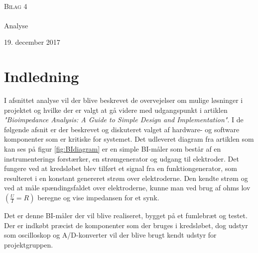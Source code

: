 
\usepackage{siunitx}


\begin{titlingpage}
\begin{center}

~ \\[3cm]


\textsc{\LARGE Bilag 4}\\[1.5cm]


\noindent\makebox[\linewidth]{\rule{\textwidth}{0.4pt}}\\
[0.5cm]{\Huge Analyse}
\noindent\makebox[\linewidth]{\rule{\textwidth}{0.4pt}}
\end{center}
\vfill
\begin{center}
{\large 19. december 2017}
\end{center}
\end{titlingpage}

\newpage
\tableofcontents*
\newpage


\chapter{Indledning}

I afsnittet analyse vil der blive beskrevet de overvejelser om mulige løsninger i projektet og hvilke der er valgt at gå videre med udgangspunkt i artiklen \textit{"Bioimpedance Analysis: A Guide to Simple Design and Implementation"}. I de følgende afsnit er der beskrevet og diskuteret valget af hardware- og software komponenter som er kritiske for systemet. Det udleveret diagram fra artiklen som kan ses på figur \ref{fig:BIdiagram} er en simple BI-måler som består af en instrumenterings forstærker, en strømgenerator og udgang til elektroder. Det fungere ved at kredsløbet blev tilført et signal fra en funktiongenerator, som resulteret i en konstant genereret strøm over elektroderne. Den kendte strøm og ved at måle spændingsfaldet over elektroderne, kunne man ved brug af ohms lov $(\frac{U}{I}=R)$ beregne og vise impedansen for et synk.

Det er denne BI-måler der vil blive realiseret, bygget på et fumlebræt og testet. Der er indkøbt præcist de komponenter som der bruges i kredsløbet, dog udstyr som oscilloskop og A/D-konverter vil der blive brugt kendt udstyr for projektgruppen. 






